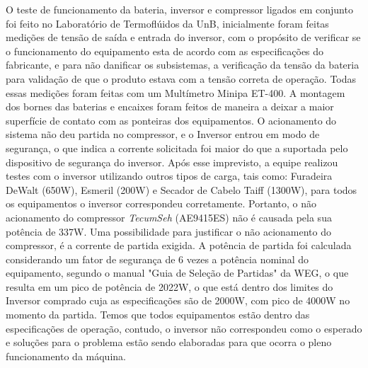        O teste de funcionamento da bateria, inversor e compressor ligados em conjunto foi feito no Laboratório de Termoflúidos da UnB, inicialmente foram feitas medições de tensão de saída e entrada do inversor, com o propósito  de verificar se o funcionamento do equipamento esta de acordo com as especificações do fabricante, e para não danificar os subsistemas, a verificação da tensão da bateria para validação de que o produto estava com a tensão correta de operação. Todas essas medições foram feitas com um Multímetro Minipa ET-400. A montagem dos bornes das baterias e encaixes foram feitos de maneira a deixar a maior superfície de contato com as ponteiras dos equipamentos.
       O acionamento do sistema não deu partida no compressor, e o Inversor entrou em modo de segurança, o que indica  a corrente solicitada foi maior do que a suportada pelo dispositivo de segurança do inversor. Após esse imprevisto, a equipe realizou testes com o inversor utilizando outros tipos de carga, tais como: Furadeira DeWalt (650W), Esmeril (200W) e Secador de Cabelo Taiff (1300W), para todos os equipamentos o inversor correspondeu corretamente. Portanto,  o não acionamento do compressor \textit{TecumSeh} (AE9415ES) não é causada pela sua potência de 337W.
       Uma possibilidade para justificar o não acionamento do compressor, é a corrente de partida exigida. A potência de partida foi calculada considerando um fator de segurança de 6 vezes a potência nominal do equipamento, segundo o manual "Guia de Seleção de Partidas" da WEG, o que resulta em um pico de potência de 2022W, o que está dentro dos limites do Inversor comprado cuja as especificações são de 2000W, com pico de 4000W no momento da partida. Temos que todos equipamentos estão dentro das especificações de operação, contudo, o inversor não correspondeu como o esperado e soluções para o problema estão sendo elaboradas para que ocorra o pleno funcionamento da máquina.



